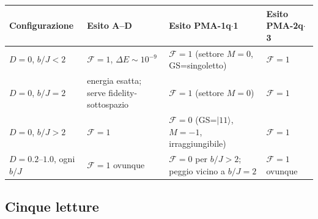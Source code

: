 \documentclass[11pt,a4paper]{article}
\begin{document}
\begin{center}
\renewcommand{\arraystretch}{1.35}
\small
\begin{tabular}{@{}p{2.6cm}p{2.9cm}p{3.6cm}p{3.6cm}@{}}
\toprule
\rowcolor{inkblue!10}
\textbf{Configurazione} & \textbf{Esito A--D} & \textbf{Esito PMA-1q$\cdot$1} & \textbf{Esito PMA-2q$\cdot$3}\\
\midrule
$D=0$, $b/J<2$ & $\mathcal F=1$, $\Delta E\sim10^{-9}$ & $\mathcal F=1$ (settore $M{=}0$, GS=singoletto) & $\mathcal F=1$\\
$D=0$, $b/J=2$ & energia esatta; serve fidelity-sottospazio & $\mathcal F=1$ (settore $M{=}0$) & $\mathcal F=1$\\
$D=0$, $b/J>2$ & $\mathcal F=1$ & $\mathcal F=0$ (GS=$|11\rangle$, $M{=}-1$, irraggiungibile) & $\mathcal F=1$\\
$D=0.2$--$1.0$, ogni $b/J$ & $\mathcal F=1$ ovunque & $\mathcal F=0$ per $b/J{>}2$; peggio vicino a $b/J{=}2$ & $\mathcal F=1$ ovunque\\
\bottomrule
\end{tabular}
\end{center}

\subsection*{Cinque letture}
\end{document}
